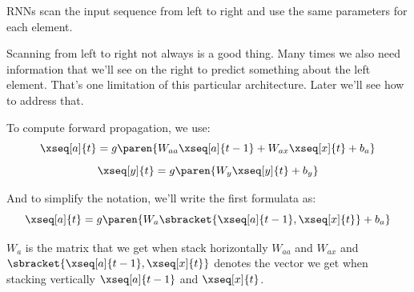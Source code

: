 \documentclass[12pt, a4paper, oneside]{book}
\begin{document}
RNNs scan the input sequence from left to right and use the same parameters
for each element.

Scanning from left to right not always is a good thing. Many times we also need
information that we'll see on the right to predict something about the left
element. That's one limitation of this particular architecture. Later we'll see
how to address that.

To compute forward propagation, we use:
\[
\xseq[a]{t}=g\paren{W_{aa}\xseq[a]{t-1}+W_{ax}\xseq[x]{t}+b_{a}}
\]
\[
\xseq[y]{t}=g\paren{W_{y}\xseq[y]{t}+b_{y}}
\]

And to simplify the notation, we'll write the first formulata as:
\[
\xseq[a]{t}=g\paren{W_{a}\sbracket{\xseq[a]{t-1}, \xseq[x]{t}}+b_{a}}
\]

$W_a$ is the matrix that we get when stack horizontally $W_{aa}$ and $W_{ax}$
and $\sbracket{\xseq[a]{t-1}, \xseq[x]{t}}$ denotes the vector we get when
stacking vertically $\xseq[a]{t-1}$ and $\xseq[x]{t}$.

\end{document}
